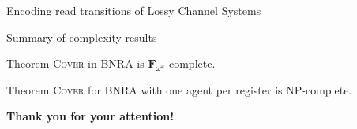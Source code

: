 \documentclass{beamer}
\newcommand{\COVER}{\textsc{Cover}}
\begin{document}
\begin{frame}{Encoding read transitions of Lossy Channel Systems}
	\centering
	 
\end{frame}

\begin{frame}{Summary of complexity results}

	\begin{block}{Theorem}
		{\COVER{}} in BNRA is $\mathbf{F}_{\omega^\omega}$-complete.
	\end{block}
		
	\pause
	\begin{block}{Theorem}
	\COVER{}{} for BNRA with one agent per register is NP-complete. 
	\end{block}
\end{frame}

\begin{frame}{}
	
	\Huge \textbf{Thank you for your attention!}
	
\end{frame}
\end{document}
